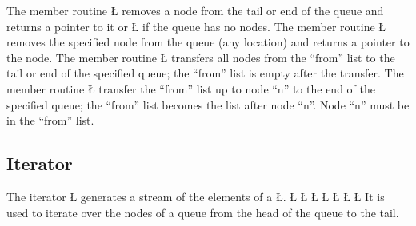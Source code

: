 \documentclass[openright,twoside]{report}
\begin{document}
The member routine \LGinlinetrue\LGbegin\lgrinde\L{}\endlgrinde\LGend{} removes a node from the tail or end of the queue and returns a pointer to it or \LGinlinetrue\LGbegin\lgrinde\L{}\endlgrinde\LGend{} if the queue has no nodes.
The member routine \LGinlinetrue\LGbegin\lgrinde\L{}\endlgrinde\LGend{} removes the specified node from the queue (any location) and returns a pointer to the node.
The member routine \LGinlinetrue\LGbegin\lgrinde\L{}\endlgrinde\LGend{} transfers all nodes from the ``from'' list to the tail or end of the specified queue;
the ``from'' list is empty after the transfer.
The member routine \LGinlinetrue\LGbegin\lgrinde\L{}\endlgrinde\LGend{} transfer the ``from'' list up to node ``n'' to the end of the specified queue;
the ``from'' list becomes the list after node ``n''.
Node ``n'' must be in the ``from'' list.


\subsection{Iterator}

The iterator \LGinlinetrue\LGbegin\lgrinde\L{}\endlgrinde\LGend{} generates a stream of the elements of a \LGinlinetrue\LGbegin\lgrinde\L{}\endlgrinde\LGend{}.
\LGinlinefalse\LGbegin\lgrinde
\L{}
\L{}
\L{\LB{}}
\L{\LB{}}
\L{\LB{}}
\L{\LB{}}
\L{\LB{\};}}
\endlgrinde\LGend
{}%
%
It is used to iterate over the nodes of a queue from the head of the queue to the tail.
\end{document}
